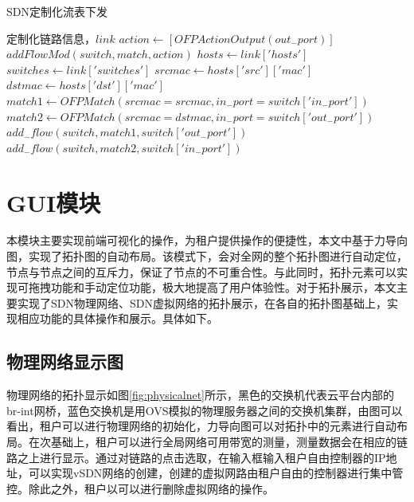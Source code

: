 \begin{algorithm}[!htb]
    \caption{SDN定制化流表下发}
    \begin{algorithmic}[1] %
        \Require 定制化链路信息，$link$
        	\State $action \gets [OFPActionOutput(out_{-}port)]$
        	\State $addFlowMod(switch,match,action)$
        	\State 
        \EndFunction
        	\State $hosts \gets link['hosts']$
        	\State $switches \gets link['switches']$
        	\State $srcmac \gets hosts['src']['mac']$
        	\State $dstmac \gets hosts['dst']['mac']$
        		\State $match1 \gets OFPMatch(srcmac=srcmac,in_{-}port=switch['in_{-}port'])$
        		\State $match2 \gets OFPMatch(srcmac=dstmac,in_{-}port=switch['out_{-}port'])$
            	\State $add_{-}flow(switch,match1,switch['out_{-}port'])$
            	\State $add_{-}flow(switch,match2,switch['in_{-}port'])$
            \EndFor        	
        \EndFunction
    \end{algorithmic}
\end{algorithm}

\section{GUI模块}
本模块主要实现前端可视化的操作，为租户提供操作的便捷性，本文中基于力导向图，实现了拓扑图的自动布局。该模式下，会对全网的整个拓扑图进行自动定位，节点与节点之间的互斥力，保证了节点的不可重合性。与此同时，拓扑元素可以实现可拖拽功能和手动定位功能，极大地提高了用户体验性。对于拓扑展示，本文主要实现了SDN物理网络、SDN虚拟网络的拓扑展示，在各自的拓扑图基础上，实现相应功能的具体操作和展示。具体如下。

\subsection{物理网络显示图}
物理网络的拓扑显示如图\ref{fig:physicalnet}所示，黑色的交换机代表云平台内部的br-int网桥，蓝色交换机是用OVS模拟的物理服务器之间的交换机集群，由图可以看出，租户可以进行物理网络的初始化，力导向图可以对拓扑中的元素进行自动布局。在次基础上，租户可以进行全局网络可用带宽的测量，测量数据会在相应的链路之上进行显示。通过对链路的点击选取，在输入框输入租户自由控制器的IP地址，可以实现vSDN网络的创建，创建的虚拟网路由租户自由的控制器进行集中管控。除此之外，租户以可以进行删除虚拟网络的操作。

